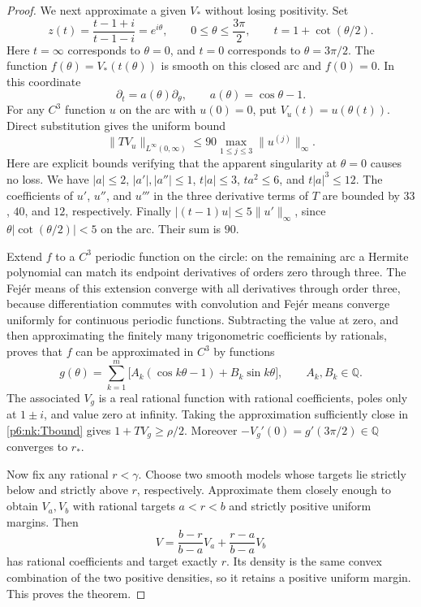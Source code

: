 \documentclass[11pt,a4paper]{article}
\theoremstyle{definition}
\theoremstyle{remark}
\numberwithin{equation}{section}
\begin{document}
\begin{proof}
We next approximate a given $V_*$ without losing positivity. Set
\[
 z(t)=\frac{t-1+i}{t-1-i}=e^{i\theta},\qquad
 0\leq\theta\leq\frac{3\pi}{2},\qquad
 t=1+\cot(\theta/2).
\]
Here $t=\infty$ corresponds to $\theta=0$, and $t=0$ corresponds to
$\theta=3\pi/2$. The function $f(\theta)=V_*(t(\theta))$ is smooth on
this closed arc and $f(0)=0$. In this coordinate
\[
 \partial_t=a(\theta)\partial_\theta,
 \qquad a(\theta)=\cos\theta-1.
\]
For any $C^3$ function $u$ on the arc with $u(0)=0$, put
$V_u(t)=u(\theta(t))$. Direct substitution gives the uniform bound
\begin{equation}
 \|TV_u\|_{L^\infty(0,\infty)}
 \leq90\max_{1\leq j\leq3}\|u^{(j)}\|_\infty.
 \label{p6:nk:Tbound}
\end{equation}
Here are explicit bounds verifying that the apparent singularity at
$\theta=0$ causes no loss. We have $|a|\leq2$,
$|a'|,|a''|\leq1$, $t|a|\leq3$, $ta^2\leq6$, and
$t|a|^3\leq12$. The coefficients of $u'$, $u''$, and $u'''$ in the
three derivative terms of $T$ are bounded by $33$, $40$, and $12$,
respectively. Finally
$|(t-1)u|\leq5\|u'\|_\infty$, since
$\theta|\cot(\theta/2)|<5$ on the arc. Their sum is $90$.

Extend $f$ to a $C^3$ periodic function on the circle: on the remaining
arc a Hermite polynomial can match its endpoint derivatives of orders
zero through three. The Fej\'er means of this extension converge with
all derivatives through order three, because differentiation commutes
with convolution and Fej\'er means converge uniformly for continuous
periodic functions. Subtracting the value at zero, and then approximating
the finitely many trigonometric coefficients by rationals, proves that
$f$ can be approximated in $C^3$ by functions
\begin{equation}
 g(\theta)=\sum_{k=1}^m
       \bigl[A_k(\cos k\theta-1)+B_k\sin k\theta\bigr],
 \qquad A_k,B_k\in\mathbb Q.
 \label{p6:nk:trig}
\end{equation}
The associated $V_g$ is a real rational function with rational
coefficients, poles only at $1\pm i$, and value zero at infinity.
Taking the approximation sufficiently close in \eqref{p6:nk:Tbound} gives
$1+TV_g\geq\rho/2$. Moreover
$-V_g'(0)=g'(3\pi/2)\in\mathbb Q$ converges to $r_*$.

Now fix any rational $r<\gamma$. Choose two smooth models whose targets
lie strictly below and strictly above $r$, respectively. Approximate them
closely enough to obtain $V_a,V_b$ with rational targets $a<r<b$ and
strictly positive uniform margins. Then
\[
 V=\frac{b-r}{b-a}V_a+\frac{r-a}{b-a}V_b
\]
has rational coefficients and target exactly $r$. Its density is the
same convex combination of the two positive densities, so it retains
a positive uniform margin. This proves the theorem.
\end{proof}
\end{document}
